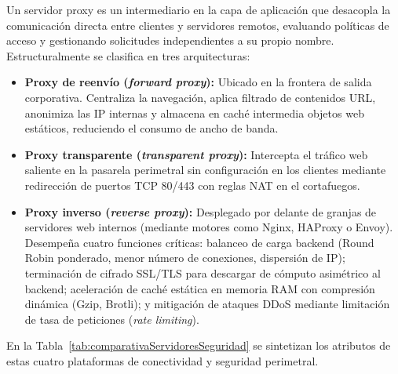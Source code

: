 \documentclass[12pt]{article}
\begin{document}
Un servidor proxy es un intermediario en la capa de aplicación que desacopla la comunicación directa entre clientes y servidores remotos, evaluando políticas de acceso y gestionando solicitudes independientes a su propio nombre. Estructuralmente se clasifica en tres arquitecturas:
\begin{itemize}[noitemsep, topsep=1pt, parsep=0pt]
    \item \textbf{Proxy de reenvío (\textit{forward proxy}):} Ubicado en la frontera de salida corporativa. Centraliza la navegación, aplica filtrado de contenidos URL, anonimiza las IP internas y almacena en caché intermedia objetos web estáticos, reduciendo el consumo de ancho de banda.
    \item \textbf{Proxy transparente (\textit{transparent proxy}):} Intercepta el tráfico web saliente en la pasarela perimetral sin configuración en los clientes mediante redirección de puertos TCP 80/443 con reglas NAT en el cortafuegos.
    \item \textbf{Proxy inverso (\textit{reverse proxy}):} Desplegado por delante de granjas de servidores web internos (mediante motores como Nginx, HAProxy o Envoy). Desempeña cuatro funciones críticas: balanceo de carga backend (Round Robin ponderado, menor número de conexiones, dispersión de IP); terminación de cifrado SSL/TLS para descargar de cómputo asimétrico al backend; aceleración de caché estática en memoria RAM con compresión dinámica (Gzip, Brotli); y mitigación de ataques DDoS mediante limitación de tasa de peticiones (\textit{rate limiting}).
\end{itemize}

En la Tabla~\ref{tab:comparativaServidoresSeguridad} se sintetizan los atributos de estas cuatro plataformas de conectividad y seguridad perimetral.
\end{document}
